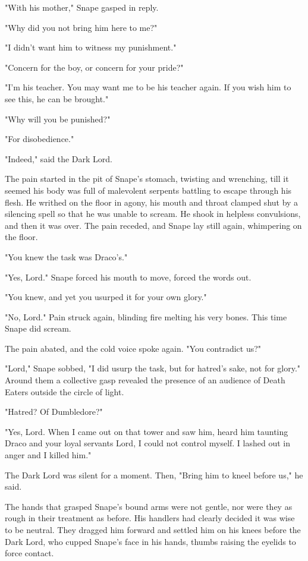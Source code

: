 "With his mother," Snape gasped in reply.

"Why did you not bring him here to me?"

"I didn't want him to witness my punishment."

"Concern for the boy, or concern for your pride?"

"I'm his teacher. You may want me to be his teacher again. If you wish him to see this, he can be brought."

"Why will you be punished?"

"For disobedience."

"Indeed," said the Dark Lord.

The pain started in the pit of Snape's stomach, twisting and wrenching, till it seemed his body was full of malevolent serpents battling to escape through his flesh. He writhed on the floor in agony, his mouth and throat clamped shut by a silencing spell so that he was unable to scream. He shook in helpless convulsions, and then it was over. The pain receded, and Snape lay still again, whimpering on the floor.

"You knew the task was Draco's."

"Yes, Lord." Snape forced his mouth to move, forced the words out.

"You knew, and yet you usurped it for your own glory."

"No, Lord." Pain struck again, blinding fire melting his very bones. This time Snape did scream.

The pain abated, and the cold voice spoke again. "You contradict us?"

"Lord," Snape sobbed, "I did usurp the task, but for hatred's sake, not for glory." Around them a collective gasp revealed the presence of an audience of Death Eaters outside the circle of light.

"Hatred? Of Dumbledore?"

"Yes, Lord. When I came out on that tower and saw him, heard him taunting Draco and your loyal servants{\el} Lord, I could not control myself. I lashed out in anger{\el} and I killed him."

The Dark Lord was silent for a moment. Then, "Bring him to kneel before us," he said.

The hands that grasped Snape's bound arms were not gentle, nor were they as rough in their treatment as before. His handlers had clearly decided it was wise to be neutral. They dragged him forward and settled him on his knees before the Dark Lord, who cupped Snape's face in his hands, thumbs raising the eyelids to force contact.

